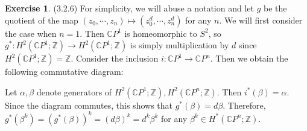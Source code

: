\documentclass[12pt, psamsfonts]{amsart}
\theoremstyle{definition}
\newtheorem*{exer}{Exercise}
\theoremstyle{remark}
\numberwithin{equation}{section}
\begin{document}
\begin{exer}{(3.2.6)}
  For simplicity, we will abuse a notation and let $g$ be the quotient of the map $(z_0, \cdots, z_n) \mapsto (z_0^d, \cdots, z_n^d)$ for any $n$.
  We will first consider the case when $n = 1$.
  Then $\mathbb{C}P^1$ is homeomorphic to $S^2$, so $g^{\ast}: H^2(\mathbb{C}P^1; \mathbb{Z}) \rightarrow H^2(\mathbb{C}P^1; \mathbb{Z})$ is simply multiplication by $d$ since $H^2(\mathbb{C}P^1; \mathbb{Z}) = \mathbb{Z}$.
  Consider the inclusion $i: \mathbb{C}P^1 \rightarrow \mathbb{C}P^n$.
  Then we obtain the following commutative diagram:
  \begin{center}
  \end{center}
  Let $\alpha, \beta$ denote generators of $H^2(\mathbb{C}P^1; \mathbb{Z}), H^2(\mathbb{C}P^n; \mathbb{Z})$.
  Then $i^{\ast}(\beta) = \alpha$.
  Since the diagram commutes, this shows that $g^{\ast}(\beta) = d\beta$.
  Therefore, $g^{\ast}(\beta^k) = (g^{\ast}(\beta))^k = (d\beta)^k = d^k\beta^k$ for any $\beta^k \in H^{\ast}(\mathbb{C}P^n; \mathbb{Z})$.
\end{exer}
\end{document}
